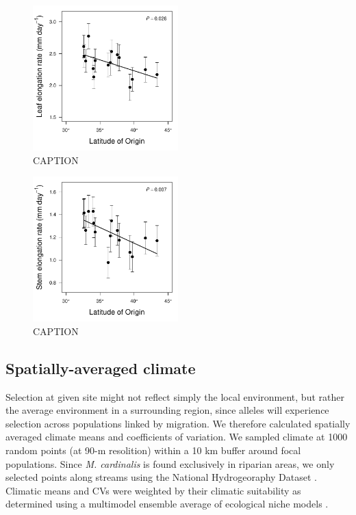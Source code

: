 \documentclass[11pt, oneside]{article}\usepackage[]{graphicx}\usepackage[]{color}
\begin{document}
\begin{figure}[h!]
	\centerline{\includegraphics[width=0.5\textwidth]{Figures/Figure_LLL_Lat.pdf}}
	\fontsize{10}{12}
	\selectfont
	\caption[Southern populations grow faster (leaf expansion rate).]{CAPTION}
	\label{fig:Fig_LLL}
\end{figure}

\begin{figure}
	\centerline{\includegraphics[width=0.5\textwidth]{Figures/Figure_Height_Lat.pdf}}
	\fontsize{10}{12}
	\selectfont
	\caption[Southern populations grow faster (shoot elongation rate).]{CAPTION}
	\label{fig:Fig_height}
\end{figure}

\subsection*{Spatially-averaged climate}

Selection at given site might not reflect simply the local environment, but rather the average environment in a surrounding region, since alleles will experience selection across populations linked by migration. We therefore calculated spatially averaged climate means and coefficients of variation. We sampled climate at 1000 random points (at 90-m resolition) within a 10 km buffer around focal populations. Since \textit{M. cardinalis} is found exclusively in riparian areas, we only selected points along streams using the National Hydrogeoraphy Dataset \citep{NHD}. Climatic means and CVs were weighted by their climatic suitability as determined using a multimodel ensemble average of ecological niche models \citep{Angert_ENM}.
\end{document}
